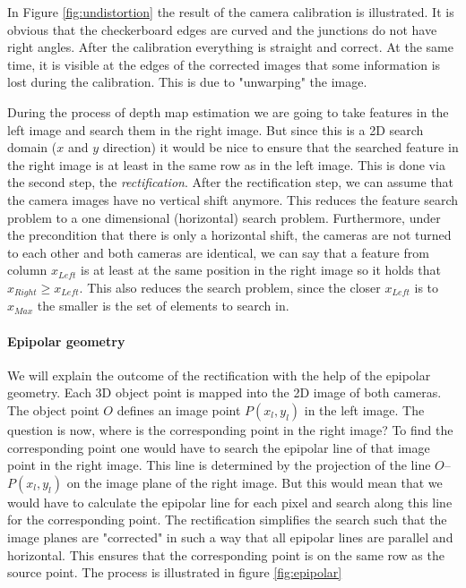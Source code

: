 \documentclass[11pt]{article}
\begin{document}
In Figure \ref{fig:undistortion} the result of the camera calibration is illustrated. It is obvious that the checkerboard edges are curved and the junctions do not have right angles. After the calibration everything is straight and correct. At the same time, it is visible at the edges of the corrected images that some information is lost during the calibration. This is due to "unwarping" the image.

\bigskip

During the process of depth map estimation we are going to take features in the left image and search them in the right image. But since this is a 2D search domain ($x$ and $y$ direction) it would be nice to ensure that the searched feature in the right image is at least in the same row as in the left image. This is done via the second step, the \emph{rectification}. After the rectification step, we can assume that the camera images have no vertical shift anymore. This reduces the feature search problem to a one dimensional (horizontal) search problem. Furthermore, under the precondition that there is only a horizontal shift, the cameras are not turned to each other and both cameras are identical, we can say that a feature from column $x_{Left}$ is at least at the same position in the right image so it holds that $x_{Right}\geq x_{Left}$. This also reduces the search problem, since the closer $x_{Left}$ is to $x_{Max}$ the smaller is the set of elements to search in.

\paragraph{Epipolar geometry} We will explain the outcome of the rectification with the help of the epipolar geometry. Each 3D object point is mapped into the 2D image of both cameras. The object point $O$ defines an image point $P(x_l,y_l)$ in the left image. The question is now, where is the corresponding point in the right image? To find the corresponding point one would have to search the epipolar line of that image point in the right image. This line is determined by the projection of the line $O$--$P(x_l,y_l)$ on the image plane of the right image. But this would mean that we would have to calculate the epipolar line for each pixel and search along this line for the corresponding point. The rectification simplifies the search such that the image planes are "corrected" in such a way that all epipolar lines are parallel and horizontal. This ensures that the corresponding point is on the same row as the source point. The process is illustrated in figure \ref{fig:epipolar}
 
\end{document}
